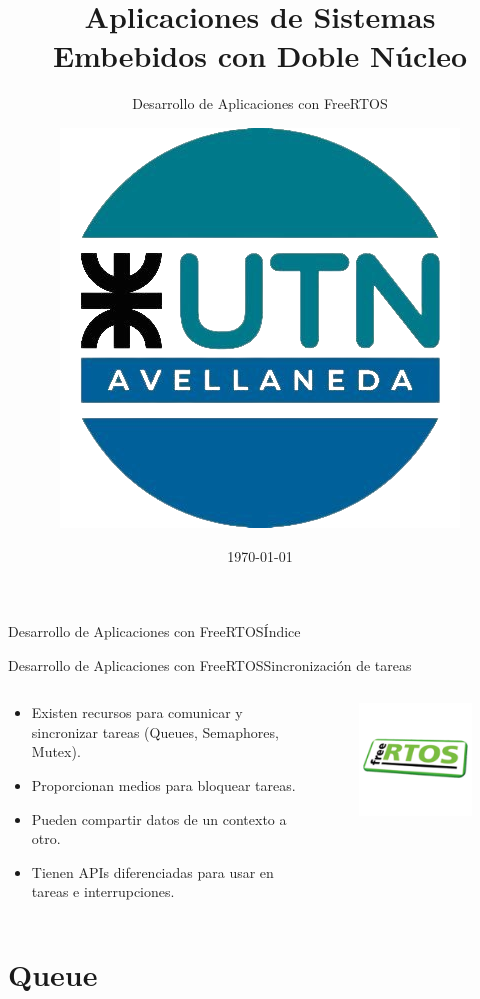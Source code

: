 \documentclass[aspectratio=169, xcolor=dvipsnames]{beamer}
\title{Aplicaciones de Sistemas Embebidos con Doble Núcleo}
\subtitle{Desarrollo de Aplicaciones con FreeRTOS}
\author[Fabrizio Carlassara - Laboratorio de Sistemas Embebidos]{\includegraphics[scale=0.15]{resources/images/utn_logo.png}}
\institute{UTN FRA\\Departamento de Ingeniería Electrónica\\Laboratorio de Sistemas Embebidos}
\date[]{\today}
\begin{document}
\frame{\titlepage}
\begin{frame}{Desarrollo de Aplicaciones con FreeRTOS}{Índice}
\begin{multicols}{2}
\tableofcontents
\end{multicols}
\end{frame}

\begin{frame}{Desarrollo de Aplicaciones con FreeRTOS}{Sincronización de tareas}
\begin{columns}
\begin{column}{0.5\textwidth}
\begin{itemize}
    \item Existen recursos para comunicar y sincronizar tareas (Queues, Semaphores, Mutex).
    \item Proporcionan medios para bloquear tareas.
    \item Pueden compartir datos de un contexto a otro.
    \item Tienen APIs diferenciadas para usar en tareas e interrupciones.
\end{itemize}
\end{column}
\begin{column}{0.5\textwidth}
\begin{figure}
\centering
\includegraphics[width=0.75\linewidth]{resources/images/freertos_logo.png}
\end{figure}
\end{column}
\end{columns}
\end{frame}

\section{Queue}
\end{document}
